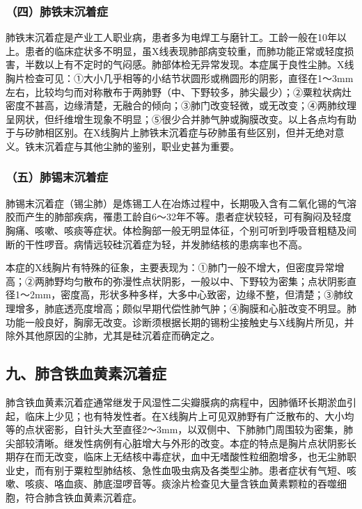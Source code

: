 \subsubsection{（四）肺铁末沉着症}

肺铁末沉着症是产业工人职业病，患者多为电焊工与磨针工。工龄一般在10年以上。患者的临床症状多不明显，虽X线表现肺部病变较重，而肺功能正常或轻度损害，半数以上有不定时的气闷感。肺部体检无异常发现。本症属于良性尘肺。X线胸片检查可见：①大小几乎相等的小结节状圆形或椭圆形的阴影，直径在1～3mm左右，比较均匀而对称散布于两肺野（中、下野较多，肺尖最少）；②粟粒状病灶密度不甚高，边缘清楚，无融合的倾向；③肺门改变轻微，或无改变；④两肺纹理呈网状，但纤维增生现象不明显；⑤很少合并肺气肿或胸膜改变。以上各点均有助于与矽肺相区别。在X线胸片上肺铁末沉着症与矽肺虽有些区别，但并无绝对意义。铁末沉着症与其他尘肺的鉴别，职业史甚为重要。

\subsubsection{（五）肺锡末沉着症}

肺锡末沉着症（锡尘肺）是炼锡工人在冶炼过程中，长期吸入含有二氧化锡的气溶胶而产生的肺部疾病，罹患工龄自6～32年不等。患者症状较轻，可有胸闷及轻度胸痛、咳嗽、咳痰等症状。体检胸部一般无明显体征，个别可听到呼吸音粗糙及间断的干性啰音。病情远较硅沉着症为轻，并发肺结核的患病率也不高。

本症的X线胸片有特殊的征象，主要表现为：①肺门一般不增大，但密度异常增高；②两肺野均匀散布的弥漫性点状阴影，一般以中、下野较为密集；点状阴影直径1～2mm，密度高，形状多种多样，大多中心致密，边缘不整，但清楚；③肺纹理增多，肺底透亮度增高；颇似早期代偿性肺气肿；④胸膜和心脏改变不明显。肺功能一般良好，胸廓无改变。诊断须根据长期的锡粉尘接触史与X线胸片所见，并除外其他原因的尘肺，尤其是硅沉着症而确定之。

\subsection{九、肺含铁血黄素沉着症}

肺含铁血黄素沉着症通常继发于风湿性二尖瓣膜病的病程中，因肺循环长期淤血引起，临床上少见；也有特发性者。在X线胸片上可见双肺野有广泛散布的、大小均等的点状密影，自针头大至直径2～3mm，以双侧中、下肺肺门周围较为密集，肺尖部较清晰。继发性病例有心脏增大与外形的改变。本症的特点是胸片点状阴影长期存在而无改变，临床上无结核中毒症状，血中无嗜酸性粒细胞增多，也无尘肺职业史，而有别于粟粒型肺结核、急性血吸虫病及各类型尘肺。患者症状有气短、咳嗽、咳痰、咯血痰、肺底湿啰音等。痰涂片检查见大量含铁血黄素颗粒的吞噬细胞，符合肺含铁血黄素沉着症。

